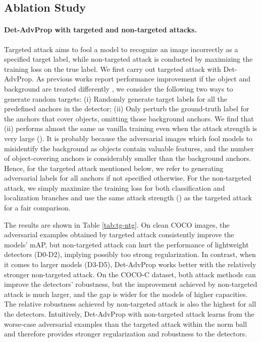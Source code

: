 \documentclass[final]{cvpr}
\begin{document}
\subsection{Ablation Study}
\label{sec:ablation}
\paragraph{Det-AdvProp with targeted and non-targeted attacks.}
Targeted attack aims to fool a model to recognize an image incorrectly as a specified target label, while non-targeted attack is conducted by maximizing the training loss on the true label.
We first carry out targeted attack with Det-AdvProp.
As previous works report performance improvement if the object and background are treated differently \cite{zoph2019learning}, we consider the following two ways to generate random targets:
(i) Randomly generate target labels for all the predefined anchors in the detector; (ii) Only perturb the ground-truth label for the anchors that cover objects, omitting those background anchors.
We find that (ii) performs almost the same as vanilla training even when the attack strength is very large ().
It is probably because the adversarial images which fool models to misidentify the background as objects contain valuable features, and the number of object-covering anchors is considerably smaller than the background anchors.
Hence, for the targeted attack mentioned below, we refer to generating adversarial labels for all anchors if not specified otherwise.
For the non-targeted attack, we simply maximize the training loss for both classification and localization branches and use the same attack strength () as the targeted attack for a fair comparison.

The results are shown in Table \ref{tab:tg-ntg}.
On clean COCO images, the adversarial examples obtained by targeted attack consistently improve the models' mAP, but non-targeted attack can hurt the performance of lightweight detectors (D0-D2), implying possibly too strong regularization.
In contrast, when it comes to larger models (D3-D5), Det-AdvProp works better with the relatively stronger non-targeted attack.
On the COCO-C dataset, both attack methods can improve the detectors' robustness, but the improvement achieved by non-targeted attack is much larger, and the gap is wider for the models of higher capacities.
The relative robustness achieved by non-targeted attack is also the highest for all the detectors.
Intuitively, Det-AdvProp with non-targeted attack learns from the worse-case adversarial examples than the targeted attack within the  norm ball and therefore provides stronger regularization and robustness to the detectors.
\end{document}
